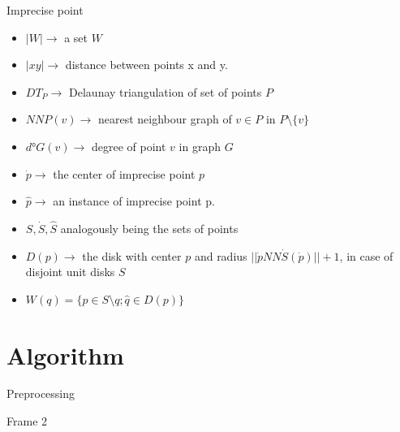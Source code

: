 \documentclass{beamer}
\begin{document}
\begin{frame}{Imprecise point}
\begin{itemize}
\item $|W| \rightarrow $ a set $W$
\item $|xy| \rightarrow $ distance between points x and y.
\item $DT_P \rightarrow $ Delaunay triangulation of set of points $P$
\item $NNP(v) \rightarrow $ nearest neighbour graph of $v \in P$ in $P \setminus \{v\}$
\item $d°G(v) \rightarrow $ degree of point $v$ in graph $G$
\item $\dot{p} \rightarrow $ the center of imprecise point $p$
\item $\hat{p} \rightarrow $ an instance of imprecise point p.
\item $S, \dot{S}, \hat{S} $ analogously being the sets of points 
\item $D(p) \rightarrow $ the disk with center $p$ and radius $||\dot{p} NN\dot{S}(\dot{p})|| + 1$, in case of disjoint unit disks $S$
\item $W(q) = \{p \in S \setminus {q}; \hat{q} \in D(p)\}$ 
\end{itemize}

\end{frame}


\section{Algorithm}
\frame{\tableofcontents[currentsubsection]}
\begin{frame}{Preprocessing}

\end{frame}

\begin{frame}

\end{frame}



\begin{frame}{Frame 2}
\begin{columns}
\begin{figure}
		\centering
		\hspace*{-0.5cm}%
	\end{figure}

\end{columns}
\end{frame}
\end{document}
